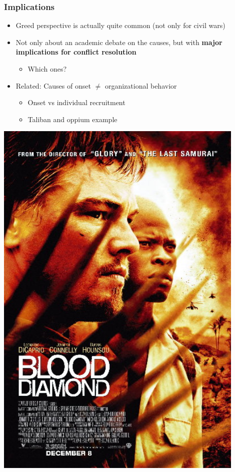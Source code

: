\documentclass[aspectratio=43]{beamer}
\begin{document}
\begin{frame}
\frametitle{Implications}
\centering

\begin{minipage}{0.58\textwidth}\centering
\begin{itemize}
  \item Greed perspective is actually quite common {\small (not only for civil wars)}
  \item Not only about an academic debate on the causes, but with \textbf{major implications for conflict resolution}
  \begin{itemize}
    \item<2-> Which ones?
  \end{itemize}
  \item<3-> Related: Causes of onset $\neq$ organizational behavior
  \begin{itemize}
    \item Onset vs individual recruitment
    \item Taliban and oppium example
  \end{itemize}
\end{itemize}
\end{minipage}\hfill
\begin{minipage}{0.40\textwidth}\centering
\includegraphics[width = 0.9\textwidth]{img/Blooddiamondposter}
\end{minipage}

\end{frame}
\end{document}
